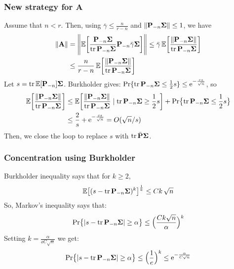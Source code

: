 \documentclass[10pt]{beamer}
\begin{document}
\begin{frame}
  \frametitle{New strategy for A}
  Assume that $n< r$. Then, using $\bar\gamma\leq \frac{n}{r-n}$
  and $\|\mathbf P_{-n}\mathbf{\Sigma}\|\leq 1$, we have
\begin{align*}
   \|\mathbf A\| & =
          \Bigg\|\mathbb E\bigg[\frac{\mathbf P_{-n}\mathbf{\Sigma}}{\mathrm{tr}\,\mathbf P_{-n}\mathbf{\Sigma}}
           \mathbf P_{-n}\bar\gamma\mathbf{\Sigma}\bigg]\Bigg\|
  \leq \bar\gamma\,\mathbb E\bigg[\frac{\|\mathbf P_{-n}\mathbf{\Sigma}\|}{\mathrm{tr}\,\mathbf P_{-n}\mathbf{\Sigma}}\bigg]\\
  &\leq \frac{n}{r-n}\,\mathbb E\bigg[\frac{\|\mathbf P_{-n}\mathbf{\Sigma}\|}{\mathrm{tr}\,\mathbf P_{-n}\mathbf{\Sigma}}\bigg]
\end{align*}
Let $s=\mathrm{tr}\,\mathbb E[\mathbf P_{-n}]\mathbf{\Sigma}$. Burkholder gives:
$\mathrm{Pr}\{\mathrm{tr}\,\mathbf P_{-n}\mathbf{\Sigma}\leq  \frac12 s\}\leq\mathrm{e}^{-\frac{cs}{\sqrt n}}$, so
\begin{align*}
  \mathbb E\bigg[\frac{\|\mathbf P_{-n}\mathbf{\Sigma}\|}{\mathrm{tr}\,\mathbf P_{-n}\mathbf{\Sigma}}\bigg]
  &\leq
    \mathbb E\bigg[\frac{\|\mathbf P_{-n}\mathbf{\Sigma}\|}{\mathrm{tr}\,\mathbf P_{-n}\mathbf{\Sigma}}\mid
    \mathrm{tr}\,\mathbf P_{-n}\mathbf{\Sigma}\geq\frac12s\bigg]
    +\mathrm{Pr}\big\{\mathrm{tr}\,\mathbf P_{-n}\mathbf{\Sigma}\leq \frac12 s\big\}\\
  &\leq \frac2{s}+\mathrm{e}^{-\frac{cs}{\sqrt n}} = O(\sqrt n/s)
\end{align*}
Then, we close the loop to replace $s$ with $\mathrm{tr}\,\bar{\mathbf P}\mathbf{\Sigma}$.
\end{frame}

\begin{frame}
  \frametitle{Concentration using Burkholder}
  Burkholder inequality says that for $k\geq 2$,
  \begin{align*}
    \mathbb E\big[(s - \mathrm{tr}\,\mathbf P_{-n}\mathbf{\Sigma})^k\big]^{\frac1k}\leq Ck\,\sqrt{n}
  \end{align*}
  So, Markov's inequality says that:
  \begin{align*}
    \mathrm{Pr}\big\{|s - \mathrm{tr}\,\mathbf P_{-n}\mathbf{\Sigma}|\geq \alpha\big\}\leq
    \Big(\frac{Ck\sqrt n}{\alpha}\Big)^k
  \end{align*}
  Setting $k=\frac {\alpha}{\ee C\sqrt n}$ we get:
  \begin{align*}
 \mathrm{Pr}\big\{|s - \mathrm{tr}\,\mathbf P_{-n}\mathbf{\Sigma}|\geq \alpha\big\}\leq
    \Big(\frac1e\Big)^k\leq \mathrm{e}^{-\frac{\alpha}{C\sqrt n}}
    \end{align*}
  \end{frame}
\end{document}

